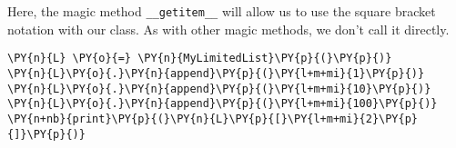 Here, the magic method \texttt{\_\_getitem\_\_} will allow us to use the square bracket notation with our class.  As with other magic methods, we don’t call it directly.

\begin{Verbatim}[commandchars=\\\{\}]
\PY{n}{L} \PY{o}{=} \PY{n}{MyLimitedList}\PY{p}{(}\PY{p}{)}
\PY{n}{L}\PY{o}{.}\PY{n}{append}\PY{p}{(}\PY{l+m+mi}{1}\PY{p}{)}
\PY{n}{L}\PY{o}{.}\PY{n}{append}\PY{p}{(}\PY{l+m+mi}{10}\PY{p}{)}
\PY{n}{L}\PY{o}{.}\PY{n}{append}\PY{p}{(}\PY{l+m+mi}{100}\PY{p}{)}
\PY{n+nb}{print}\PY{p}{(}\PY{n}{L}\PY{p}{[}\PY{l+m+mi}{2}\PY{p}{]}\PY{p}{)}
\end{Verbatim}

